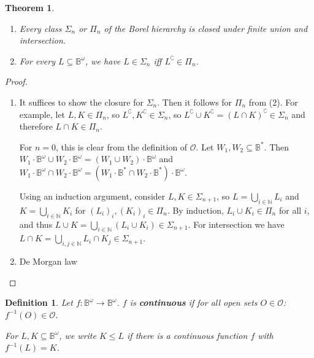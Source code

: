 \documentclass{article}
\newtheorem{theorem}{Theorem}
\newtheorem{definition}{Definition}
\begin{document}
\begin{theorem}
\begin{enumerate}
	\item Every class $\Sigma_n$ or $\Pi_n$ of the Borel hierarchy is closed under finite union and intersection. 
	\item For every $L \subseteq \mathbb{B}^\omega$, we have $L \in \Sigma_n$ iff $L^\complement \in \Pi_n$.
\end{enumerate}
\end{theorem}
\begin{proof}
	\begin{enumerate}
		\item It suffices to show the closure for $\Sigma_n$. Then it follows for $\Pi_n$ from (2). For example, let $L, K \in \Pi_n$, so $L^\complement, K^\complement \in \Sigma_n$, so $L^\complement \cup K^\complement = (L \cap K)^\complement \in \Sigma_n$ and therefore $L \cap K \in \Pi_n$.
		
			For $n = 0$, this is clear from the definition of $\mathcal{O}$. Let $W_1, W_2 \subseteq \mathbb{B}^*$. Then $W_1 \cdot \mathbb{B}^\omega \cup W_2 \cdot \mathbb{B}^\omega = (W_1 \cup W_2) \cdot \mathbb{B}^\omega$ and $W_1 \cdot \mathbb{B}^\omega \cap W_2 \cdot \mathbb{B}^\omega = (W_1 \cdot \mathbb{B}^* \cap W_2 \cdot \mathbb{B}^*) \cdot \mathbb{B}^\omega$.
			
			Using an induction argument, consider $L, K \in \Sigma_{n+1}$, so $L = \bigcup\limits_{i \in \mathbb{N}} L_i$ and $K = \bigcup\limits_{i \in \mathbb{N}} K_i$ for $(L_i)_i, (K_i)_i \in \Pi_n$. By induction, $L_i \cup K_i \in \Pi_n$ for all $i$, and thus $L \cup K = \bigcup\limits_{i \in \mathbb{N}} (L_i \cup K_i) \in \Sigma_{n+1}$. For intersection we have $L \cap K = \bigcup\limits_{i,j \in \mathbb{N}} L_i \cap K_j \in \Sigma_{n+1}$.
			
		\item De Morgan law %
	\end{enumerate}
\end{proof}

\begin{definition}
	Let $f : \mathbb{B}^\omega \rightarrow \mathbb{B}^\omega$. $f$ is \textbf{continuous} if for all open sets $O \in \mathcal{O}$: $f^{-1}(O) \in \mathcal{O}$. 
	
	For $L, K \subseteq \mathbb{B}^\omega$, we write $K \leq L$ if there is a continuous function $f$ with $f^{-1}(L) = K$.
\end{definition}
\end{document}
